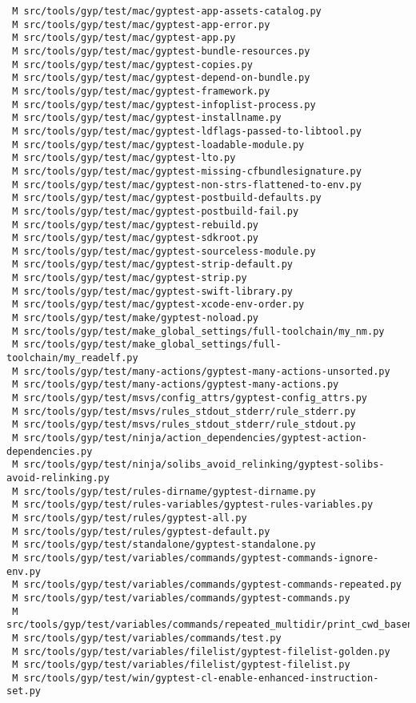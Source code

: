 \documentclass{article}
\begin{document}
\begin{verbatim}
 M src/tools/gyp/test/mac/gyptest-app-assets-catalog.py
 M src/tools/gyp/test/mac/gyptest-app-error.py
 M src/tools/gyp/test/mac/gyptest-app.py
 M src/tools/gyp/test/mac/gyptest-bundle-resources.py
 M src/tools/gyp/test/mac/gyptest-copies.py
 M src/tools/gyp/test/mac/gyptest-depend-on-bundle.py
 M src/tools/gyp/test/mac/gyptest-framework.py
 M src/tools/gyp/test/mac/gyptest-infoplist-process.py
 M src/tools/gyp/test/mac/gyptest-installname.py
 M src/tools/gyp/test/mac/gyptest-ldflags-passed-to-libtool.py
 M src/tools/gyp/test/mac/gyptest-loadable-module.py
 M src/tools/gyp/test/mac/gyptest-lto.py
 M src/tools/gyp/test/mac/gyptest-missing-cfbundlesignature.py
 M src/tools/gyp/test/mac/gyptest-non-strs-flattened-to-env.py
 M src/tools/gyp/test/mac/gyptest-postbuild-defaults.py
 M src/tools/gyp/test/mac/gyptest-postbuild-fail.py
 M src/tools/gyp/test/mac/gyptest-rebuild.py
 M src/tools/gyp/test/mac/gyptest-sdkroot.py
 M src/tools/gyp/test/mac/gyptest-sourceless-module.py
 M src/tools/gyp/test/mac/gyptest-strip-default.py
 M src/tools/gyp/test/mac/gyptest-strip.py
 M src/tools/gyp/test/mac/gyptest-swift-library.py
 M src/tools/gyp/test/mac/gyptest-xcode-env-order.py
 M src/tools/gyp/test/make/gyptest-noload.py
 M src/tools/gyp/test/make_global_settings/full-toolchain/my_nm.py
 M src/tools/gyp/test/make_global_settings/full-toolchain/my_readelf.py
 M src/tools/gyp/test/many-actions/gyptest-many-actions-unsorted.py
 M src/tools/gyp/test/many-actions/gyptest-many-actions.py
 M src/tools/gyp/test/msvs/config_attrs/gyptest-config_attrs.py
 M src/tools/gyp/test/msvs/rules_stdout_stderr/rule_stderr.py
 M src/tools/gyp/test/msvs/rules_stdout_stderr/rule_stdout.py
 M src/tools/gyp/test/ninja/action_dependencies/gyptest-action-dependencies.py
 M src/tools/gyp/test/ninja/solibs_avoid_relinking/gyptest-solibs-avoid-relinking.py
 M src/tools/gyp/test/rules-dirname/gyptest-dirname.py
 M src/tools/gyp/test/rules-variables/gyptest-rules-variables.py
 M src/tools/gyp/test/rules/gyptest-all.py
 M src/tools/gyp/test/rules/gyptest-default.py
 M src/tools/gyp/test/standalone/gyptest-standalone.py
 M src/tools/gyp/test/variables/commands/gyptest-commands-ignore-env.py
 M src/tools/gyp/test/variables/commands/gyptest-commands-repeated.py
 M src/tools/gyp/test/variables/commands/gyptest-commands.py
 M src/tools/gyp/test/variables/commands/repeated_multidir/print_cwd_basename.py
 M src/tools/gyp/test/variables/commands/test.py
 M src/tools/gyp/test/variables/filelist/gyptest-filelist-golden.py
 M src/tools/gyp/test/variables/filelist/gyptest-filelist.py
 M src/tools/gyp/test/win/gyptest-cl-enable-enhanced-instruction-set.py

\end{verbatim}
\end{document}
